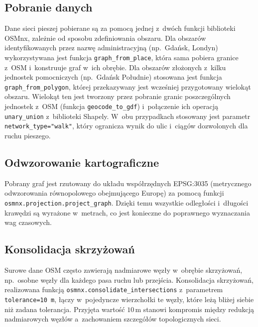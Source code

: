 \subsection{Pobranie danych}

Dane sieci pieszej pobierane są za pomocą jednej z~dwóch funkcji biblioteki OSMnx,
zależnie od sposobu zdefiniowania obszaru.
Dla obszarów identyfikowanych przez nazwę administracyjną (np.\ Gdańsk, Londyn)
wykorzystywana jest funkcja \texttt{graph\_\allowbreak from\_\allowbreak place},
która sama pobiera granice z~OSM i~konstruuje graf w~ich obrębie.
Dla obszarów złożonych z~kilku jednostek pomocniczych (np.\ Gdańsk Południe)
stosowana jest funkcja \texttt{graph\_\allowbreak from\_\allowbreak polygon},
której przekazywany jest wcześniej przygotowany wielokąt obszaru.
Wielokąt ten jest tworzony przez pobranie granic poszczególnych jednostek z~OSM
(funkcja \texttt{geocode\_\allowbreak to\_\allowbreak gdf})
i~połączenie ich operacją \texttt{unary\_\allowbreak union} z~biblioteki Shapely.
W~obu przypadkach stosowany jest parametr \texttt{network\_\allowbreak type="walk"},
który ogranicza wynik do ulic i~ciągów dozwolonych dla ruchu pieszego.

\subsection{Odwzorowanie kartograficzne}

Pobrany graf jest rzutowany do układu współrzędnych EPSG:3035 (metrycznego
odwzorowania równopolowego obejmującego Europę) za pomocą funkcji
\texttt{osmnx.\allowbreak projection.\allowbreak project\_\allowbreak graph}. Dzięki temu wszystkie odległości i~długości
krawędzi są wyrażone w~metrach, co jest konieczne do poprawnego wyznaczania wag czasowych.

\subsection{Konsolidacja skrzyżowań}

Surowe dane OSM często zawierają nadmiarowe węzły w~obrębie skrzyżowań,
np.\ osobne węzły dla każdego pasa ruchu lub przejścia.
Konsolidacja skrzyżowań, realizowana funkcją \texttt{osmnx.\allowbreak consolidate\_\allowbreak intersections}
z~parametrem \texttt{tolerance=10\,m}, łączy w~pojedyncze wierzchołki te węzły, które
leżą bliżej siebie niż zadana tolerancja. Przyjęta wartość $10\,\text{m}$ stanowi kompromis
między redukcją nadmiarowych węzłów a~zachowaniem szczegółów topologicznych sieci.

